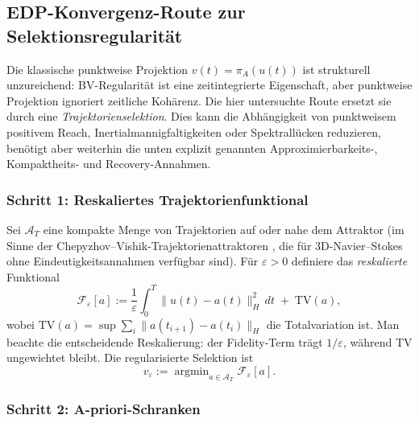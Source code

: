 \documentclass[12pt,a4paper]{article}
\theoremstyle{definition}
\theoremstyle{plain}
\theoremstyle{remark}
\begin{document}
\subsection{EDP-Konvergenz-Route zur Selektionsregularit\"at}\label{sec:gamma-edp-selection}

Die klassische punktweise Projektion $v(t) = \pi_A(u(t))$ ist strukturell unzureichend: BV-Regularit\"at ist eine zeitintegrierte Eigenschaft, aber punktweise Projektion ignoriert zeitliche Koh\"arenz. Die hier untersuchte Route ersetzt sie durch eine \emph{Trajektorienselektion}. Dies kann die Abhängigkeit von punktweisem positivem Reach, Inertialmannigfaltigkeiten oder Spektrallücken reduzieren, benötigt aber weiterhin die unten explizit genannten Approximierbarkeits-, Kompaktheits- und Recovery-Annahmen.

\subsubsection*{Schritt 1: Reskaliertes Trajektorienfunktional}

Sei $\mathcal{A}_T$ eine kompakte Menge von Trajektorien auf oder nahe dem Attraktor (im Sinne der Chepyzhov--Vishik-Trajektorienattraktoren \cite{ChepyzhovVishik2002}, die f\"ur 3D-Navier--Stokes ohne Eindeutigkeitsannahmen verf\"ugbar sind). F\"ur $\varepsilon > 0$ definiere das \emph{reskalierte} Funktional
\begin{equation}\label{eq:trajectory-functional}
  \mathcal{F}_\varepsilon[a] := \frac{1}{\varepsilon}\int_0^T \|u(t) - a(t)\|_H^2 \, dt \;+\; \mathrm{TV}(a),
\end{equation}
wobei $\mathrm{TV}(a) = \sup \sum_{i} \|a(t_{i+1}) - a(t_i)\|_H$ die Totalvariation ist. Man beachte die entscheidende Reskalierung: der Fidelity-Term tr\"agt $1/\varepsilon$, w\"ahrend TV ungewichtet bleibt. Die regularisierte Selektion ist
\begin{equation}\label{eq:reg-selection}
  v_\varepsilon := \operatorname{argmin}_{a \in \mathcal{A}_T} \mathcal{F}_\varepsilon[a].
\end{equation}

\subsubsection*{Schritt 2: A-priori-Schranken}
\end{document}
